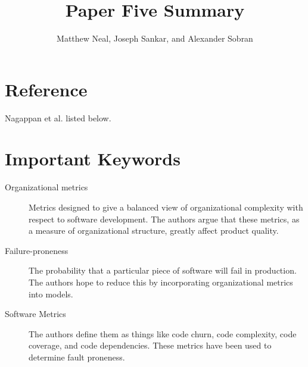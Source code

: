\documentclass[english]{article}
\begin{document}
\title{Paper Five Summary}


\author{Matthew Neal, Joseph Sankar, and Alexander Sobran}

\maketitle

\section*{Reference}

Nagappan et al. \cite{Nagappan} listed below.


\section*{Important Keywords}
\begin{description}
\item [{Organizational metrics}] Metrics designed to give a balanced view of organizational complexity with respect to software development. The authors argue that these metrics, as a measure of organizational structure, greatly affect product quality.
\item[{Failure-proneness}] The probability that a particular piece of software will fail in production. The authors hope to reduce this by incorporating organizational metrics into models.
\item[{Software Metrics}]  The authors define them as things like code churn, code complexity, code coverage, and code dependencies.  These metrics have been used to determine fault proneness.
\end{description}
\end{document}
